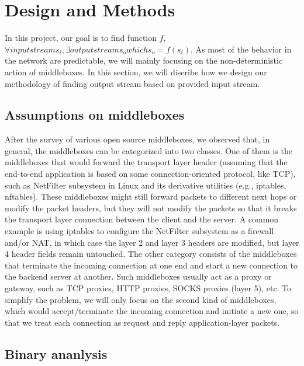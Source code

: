 \section{Design and Methods}

In this project, our goal is to find function \(f\), \(\forall input stream s_i, \exists output stream s_o which s_o = f(s_i)\).
As most of the behavior in the network are predictable, we will mainly focusing on the non-deterministic action of middleboxes.
In this section, we will discribe how we design our methodology of finding output stream based on provided input stream.

\subsection{Assumptions on middleboxes}

After the survey of various open source middleboxes, we observed that, in
general, the middleboxes can be categorized into two classes. One of them is the
middleboxes that would forward the transport layer header (assuming that the
end-to-end application is based on some connection-oriented protocol, like TCP),
such as NetFilter subsystem in Linux and its derivative utilities (e.g.,
iptables, nftables). These middleboxes might still forward packets to different
next hops or modify the packet headers, but they will not modify the packets so
that it breaks the transport layer connection between the client and the server.
A common example is using iptables to configure the NetFilter subsystem as a
firewall and/or NAT, in which case the layer 2 and layer 3 headers are modified,
but layer 4 header fields remain untouched. The other category consists of the
middleboxes that terminate the incoming connection at one end and start a new
connection to the backend server at another. Such middleboxes usually act as a
proxy or gateway, such as TCP proxies, HTTP proxies, SOCKS proxies (layer 5),
etc. To simplify the problem, we will only focus on the second kind of
middleboxes, which would accept/terminate the incoming connection and initiate a
new one, so that we treat each connection as request and reply application-layer
packets.

\subsection{Binary ananlysis}

